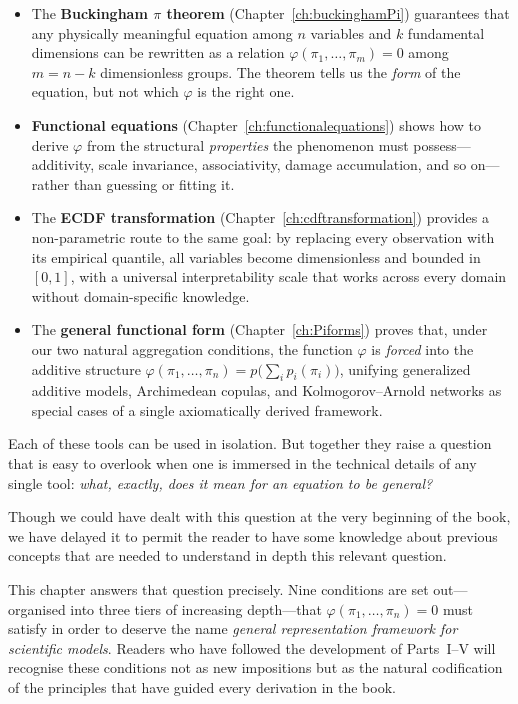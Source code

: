\begin{itemize}[leftmargin=2.5em]
  \item The \textbf{Buckingham $\pi$ theorem}
    (Chapter~\ref{ch:buckinghamPi}) guarantees that any
    physically meaningful equation among $n$ variables and $k$
    fundamental dimensions can be rewritten as a relation
    $\varphi(\pi_1,\ldots,\pi_m)=0$ among $m = n-k$
    dimensionless groups.  The theorem tells us the \emph{form}
    of the equation, but not which $\varphi$ is the right one.

  \item \textbf{Functional equations}
    (Chapter~\ref{ch:functionalequations})
    shows how to derive $\varphi$ from the structural
    \emph{properties} the phenomenon must possess---additivity,
    scale invariance, associativity, damage accumulation, and
    so on---rather than guessing or fitting it.

  \item The \textbf{ECDF transformation}
    (Chapter~\ref{ch:cdftransformation}) provides a
    non-parametric route to the same goal: by replacing every
    observation with its empirical quantile, all variables
    become dimensionless and bounded in $[0,1]$, with a
    universal interpretability scale that works across every
    domain without domain-specific knowledge.

  \item The \textbf{general functional form}
    (Chapter~\ref{ch:Piforms}) proves that, under our two natural
    aggregation conditions, the function $\varphi$ is
    \emph{forced} into the additive structure
    $\varphi(\pi_1,\ldots,\pi_n) = p\!\bigl(\sum_i p_i(\pi_i)\bigr)$,
    unifying generalized additive models, Archimedean copulas,
    and Kolmogorov--Arnold networks as special cases of a
    single axiomatically derived framework.
\end{itemize}

\noindent
Each of these tools can be used in isolation.  But together they
raise a question that is easy to overlook when one is immersed in
the technical details of any single tool: \emph{what, exactly,
does it mean for an equation to be general?}

Though we could have dealt with this question at the very beginning of the book, we have delayed it to permit the reader to have some knowledge about previous concepts that are needed to understand in depth this relevant question.

This chapter answers that question precisely.  Nine conditions are
set out---organised into three tiers of increasing depth---that
$\varphi(\pi_1,\ldots,\pi_n)=0$ must satisfy in order to deserve
the name \emph{general representation framework for scientific models}.  Readers who have
followed the development of Parts~I--V will recognise these
conditions not as new impositions but as the natural codification
of the principles that have guided every derivation in the book.


